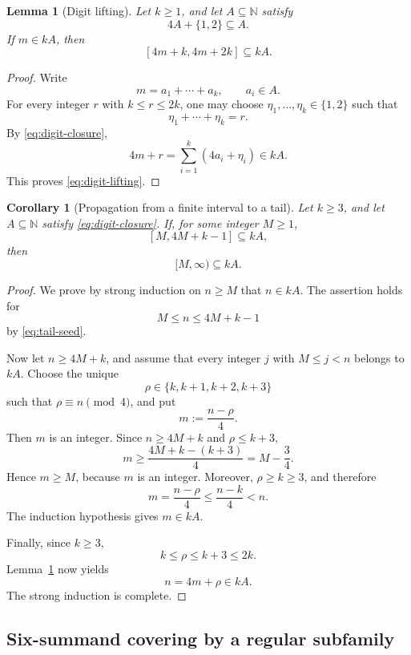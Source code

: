 \documentclass[12pt]{article}
\theoremstyle{plain}
\newtheorem{lemma}[theorem]{Lemma}
\newtheorem{corollary}[theorem]{Corollary}
\theoremstyle{definition}
\theoremstyle{plain}
\begin{document}
\begin{lemma}[Digit lifting]\label{lem:digit-lifting}
Let $k\geq1$, and let $A\subseteq\mathbb N$ satisfy
\begin{equation}\label{eq:digit-closure}
 4A+\{1,2\}\subseteq A.
\end{equation}
If $m\in kA$, then
\begin{equation}\label{eq:digit-lifting}
 [4m+k,4m+2k]\subseteq kA.
\end{equation}
\end{lemma}

\begin{proof}
Write
\[
 m=a_1+\cdots+a_k,
 \qquad a_i\in A.
\]
For every integer $r$ with $k\leq r\leq2k$, one may choose
$\eta_1,\ldots,\eta_k\in\{1,2\}$ such that
\[
 \eta_1+\cdots+\eta_k=r.
\]
By \eqref{eq:digit-closure},
\[
 4m+r
 =\sum_{i=1}^{k}(4a_i+\eta_i)
 \in kA.
\]
This proves \eqref{eq:digit-lifting}.
\end{proof}

\begin{corollary}[Propagation from a finite interval to a tail]
\label{cor:tail-propagation}
Let $k\geq3$, and let $A\subseteq\mathbb N$ satisfy
\eqref{eq:digit-closure}.  If, for some integer $M\geq1$,
\begin{equation}\label{eq:tail-seed}
 [M,4M+k-1]\subseteq kA,
\end{equation}
then
\[
 [M,\infty)\subseteq kA.
\]
\end{corollary}

\begin{proof}
We prove by strong induction on $n\geq M$ that $n\in kA$.
The assertion holds for
\[
 M\leq n\leq4M+k-1
\]
by \eqref{eq:tail-seed}.

Now let $n\geq4M+k$, and assume that every integer $j$ with
$M\leq j<n$ belongs to $kA$.  Choose the unique
\[
 \rho\in\{k,k+1,k+2,k+3\}
\]
such that $\rho\equiv n\pmod4$, and put
\[
 m:=\frac{n-\rho}{4}.
\]
Then $m$ is an integer.  Since $n\geq4M+k$ and $\rho\leq k+3$,
\[
 m\geq\frac{4M+k-(k+3)}4=M-\frac34.
\]
Hence $m\geq M$, because $m$ is an integer.  Moreover,
$\rho\geq k\geq3$, and therefore
\[
 m=\frac{n-\rho}{4}
 \leq\frac{n-k}{4}<n.
\]
The induction hypothesis gives $m\in kA$.

Finally, since $k\geq3$,
\[
 k\leq\rho\leq k+3\leq2k.
\]
Lemma~\ref{lem:digit-lifting} now yields
\[
 n=4m+\rho\in kA.
\]
The strong induction is complete.
\end{proof}

\subsection{Six-summand covering by a regular subfamily}
\end{document}
